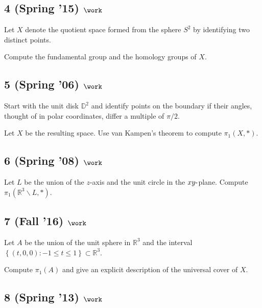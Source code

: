 \hypertarget{spring-15-work-1}{%
\subsection{\texorpdfstring{4 (Spring '15)
\(\work\)}{4 (Spring '15) \textbackslash work}}\label{spring-15-work-1}}

Let \(X\) denote the quotient space formed from the sphere \(S^2\) by
identifying two distinct points.

Compute the fundamental group and the homology groups of \(X\).

\hypertarget{spring-06-work-2}{%
\subsection{\texorpdfstring{5 (Spring '06)
\(\work\)}{5 (Spring '06) \textbackslash work}}\label{spring-06-work-2}}

Start with the unit disk \({\mathbb{D}}^2\) and identify points on the
boundary if their angles, thought of in polar coordinates, differ a
multiple of \(\pi/2\).

Let \(X\) be the resulting space. Use van Kampen's theorem to compute
\(\pi_1 (X, \ast)\).

\hypertarget{spring-08-work}{%
\subsection{\texorpdfstring{6 (Spring '08)
\(\work\)}{6 (Spring '08) \textbackslash work}}\label{spring-08-work}}

Let \(L\) be the union of the \(z\)-axis and the unit circle in the
\(xy{\hbox{-}}\)plane. Compute
\(\pi_1 ({\mathbb{R}}^3 \backslash L, \ast)\).

\hypertarget{fall-16-work-2}{%
\subsection{\texorpdfstring{7 (Fall '16)
\(\work\)}{7 (Fall '16) \textbackslash work}}\label{fall-16-work-2}}

Let \(A\) be the union of the unit sphere in \({\mathbb{R}}^3\) and the
interval
\(\left\{{(t, 0, 0) : -1 \leq t \leq 1}\right\} \subset {\mathbb{R}}^3\).

Compute \(\pi_1 (A)\) and give an explicit description of the universal
cover of \(X\).

\hypertarget{spring-13-work-1}{%
\subsection{\texorpdfstring{8 (Spring '13)
\(\work\)}{8 (Spring '13) \textbackslash work}}\label{spring-13-work-1}}

